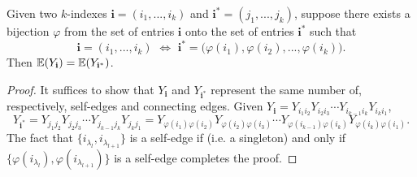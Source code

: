 \begin{lemma}
  \label{lem:equal_equiv_class_equal_expectation}
  \notready
  Given two $k$-indexes $\mathbf{i} = (i_1,...,i_k)$ and $\mathbf{i}^* = (j_1,...,j_k)$, 
  suppose there exists a bijection $\varphi$ from the set of entries $\mathbf{i}$ onto the set of entries $\mathbf{i}^*$ such that
  \[
  \mathbf{i} = (i_1,...,i_k) \,\, \Longleftrightarrow \,\, \mathbf{i}^* = \bigl( \varphi(i_1),\varphi(i_2),...,\varphi(i_k) \bigl).
  \]
  Then $\mathbb{E} (Y_\mathbf{i}) = \mathbb{E} (Y_{\mathbf{i}^*})$.
\end{lemma}
\begin{proof}
  It suffices to show that $Y_\mathbf{i}$ and $Y_{\mathbf{i}^*}$ represent the same number of, respectively, self-edges and connecting edges.
  Given $Y_\mathbf{i} = Y_{i_1 i_2}Y_{i_2 i_3} \cdots Y_{i_{k-1} i_k}Y_{i_k i_1}$,
  \[
  Y_{\mathbf{i}^*} = Y_{j_1 j_2}Y_{j_2 j_3} \cdots Y_{j_{k-1} j_k}Y_{j_k j_1} 
  = Y_{\varphi(i_1) \varphi(i_2)}Y_{\varphi(i_2) \varphi(i_3)} \cdots Y_{\varphi(i_{k-1}) \varphi(i_k)}Y_{\varphi(i_k) \varphi(i_1)}.
  \] 
  The fact that $\{ i_{\lambda_l},i_{\lambda_{l+1}} \}$ is a self-edge 
  if (i.e. a singleton) and only if $\{ \varphi(i_{\lambda_l}),\varphi(i_{\lambda_{l+1}}) \}$ is a self-edge completes the proof.
\end{proof}

